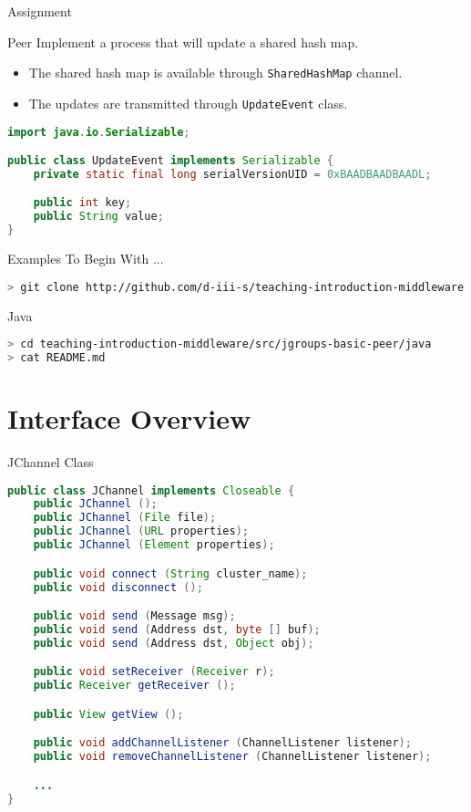 \begin{frame}[fragile]{Assignment}
    \begin{block}{Peer}
        Implement a process that will update a shared hash map.
        \begin{itemize}
            \item The shared hash map is available through \lstinline{SharedHashMap} channel.
            \item The updates are transmitted through \lstinline{UpdateEvent} class.
        \end{itemize}
    \end{block}

\begin{lstlisting}[language=java,style=mini]
import java.io.Serializable;

public class UpdateEvent implements Serializable {
    private static final long serialVersionUID = 0xBAADBAADBAADL;

    public int key;
    public String value;
}
\end{lstlisting}
\end{frame}


\begin{frame}[fragile]{Examples To Begin With ...}
\begin{lstlisting}[language=bash,style=mini]
> git clone http://github.com/d-iii-s/teaching-introduction-middleware.git
\end{lstlisting}
    \begin{block}{Java}
\begin{lstlisting}[language=bash,style=mini]
> cd teaching-introduction-middleware/src/jgroups-basic-peer/java
> cat README.md
\end{lstlisting}
    \end{block}
\end{frame}


\section{Interface Overview}


\begin{frame}[fragile]{JChannel Class}
\begin{lstlisting}[language=java,style=mini]
public class JChannel implements Closeable {
    public JChannel ();
    public JChannel (File file);
    public JChannel (URL properties);
    public JChannel (Element properties);

    public void connect (String cluster_name);
    public void disconnect ();

    public void send (Message msg);
    public void send (Address dst, byte [] buf);
    public void send (Address dst, Object obj);

    public void setReceiver (Receiver r);
    public Receiver getReceiver ();

    public View getView ();

    public void addChannelListener (ChannelListener listener);
    public void removeChannelListener (ChannelListener listener);

    ...
}
\end{lstlisting}
\end{frame}


